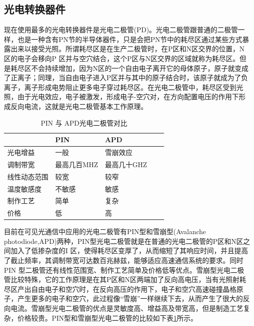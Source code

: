 \subsection{光电转换器件}
现在使用最多的光电转换器件是光电二极管(PD)。光电二极管跟普通的二极管一样，也是一种含有PN节的半导体器件，只是会把PN节中的耗尽区通过某些方式暴露出来以接受光照。所谓耗尽区是在生产二极管时，在P区和N区交界的位置，N 区的电子会移向P 区并与空穴结合，这个P区与N区交界的区域就称为耗尽区。但是耗尽区不会持续增加，因为N区的一个自由电子离开它的母体原子，原子就变成了正离子；同理，当自由电子进入P区并与其中的原子结合时，该原子就成为了负离子，离子形成电势阻止更多电子穿过耗尽区。在光电二极管中，耗尽区受到光照，由于光电效应，电子被激发，形成电子-空穴对，在方向配置电压的作用下形成反向电流，这就是光电二极管基本工作原理。
\begin{table}[htbp]
    \caption{PIN 与 APD光电二极管对比}
    \label{tab:PIN_APD_Comparsion}
    \centering
    \begin{tabular}{lllll}
        \toprule
         & PIN & APD \\
        \midrule
        光电增益       & 一般   &雪崩效应    \\
        调制带宽       & 最高几百MHZ  &最高几十GHZ    \\
        线性动态范围   & 较宽  &较窄    \\
        温度敏感度    & 不敏感  &敏感    \\
        制作工艺    &简单 &复杂    \\
        价格    & 低  &高    \\
        \bottomrule
    \end{tabular}
\end{table}

目前在可见光通信中应用的光电二极管有PIN型和雪崩型(Avalanche photodiode,APD)两种，PIN型光电二极管就是在普通的光电二极管的P区和N区之间加入了低掺杂度的I 区，使得耗尽区变厚了，从而缩短了其响应时间，并且提高了截止频率，其调制带宽可达数百兆赫兹，能够适应高速通信系统的要求。同时PIN 型二极管还有线性范围宽、制作工艺简单及价格低等优点。雪崩型光电二极管比较特殊，它的工作原理是在其P区和N区两端加了反向高电压，当有光照射耗尽区产出自由电子和空穴时，在反向高压的作用下，电子和空穴高速碰撞晶格原子，产生更多的电子和空穴，此过程像“雪崩”一样继续下去，从而产生了很大的反向电流。雪崩型光电二极管的优点是灵敏度高、增益高及带宽高，但是制造工艺复杂，价格较贵。PIN型和雪崩型光电二极管的比较如下表\ref{tab:PIN_APD_Comparsion}所示。



